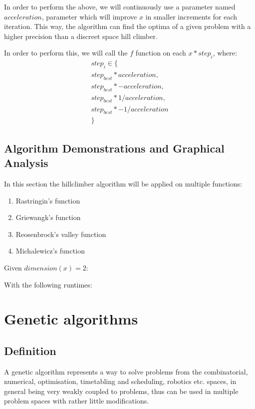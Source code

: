 \documentclass[conference]{IEEEtran}
\begin{document}
In order to perform the above, we will continuously use a parameter named $acceleration$, parameter which will improve $x$
in smaller increments for each iteration. This way, the algorithm can find the optima of a given problem with a higher precision
than a discreet space hill climber.

In order to perform this, we will call the $f$ function on each  $x * step_i$, where:
\begin{multline}
    step_i \in \{\\step_{best} * acceleration, \\step_{best} * -acceleration, \\step_{best} * 1 / acceleration, \\step_{best} * -1 / acceleration\\\}
\end{multline}

\subsection{Algorithm Demonstrations and Graphical Analysis}

In this section the hillclimber algorithm will be applied on multiple functions:
\begin{enumerate}
    \item Rastringin's function
    \item Griewangk's function
    \item Reosenbrock's valley function
    \item Michalewicz's function
\end{enumerate}

Given $dimension(x) = 2$:



With the following runtimes:



\section{Genetic algorithms}

\subsection{Definition}
A genetic algorithm represents a way to solve problems from the combinatorial, numerical, optimisation, timetabling and
scheduling, robotics etc. spaces, in general being very weakly coupled to problems, thus can be used in multiple
problem spaces with rather little modifications.
\end{document}
